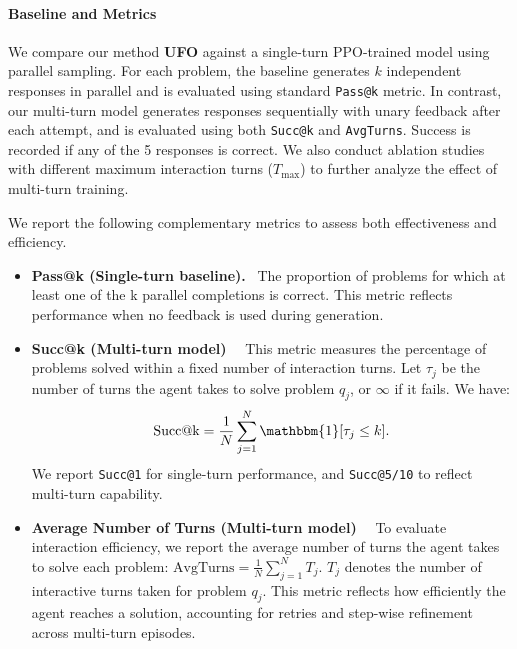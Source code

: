 \paragraph{Baseline and Metrics}
We compare our method\textbf{ UFO} against a single-turn PPO-trained model using parallel sampling. For each problem, the baseline generates $k$ independent responses in parallel and is evaluated using standard \texttt{Pass@k} metric. In contrast, our multi-turn model generates responses sequentially with unary feedback after each attempt, and is evaluated using both \texttt{Succ@k} and \texttt{AvgTurns}. Success is recorded if any of the 5 responses is correct. We also conduct ablation studies with different maximum interaction turns ($T_{\text{max}}$) to further analyze the effect of multi-turn training.

We report the following complementary metrics to assess both effectiveness and efficiency.

\begin{itemize}[topsep=0pt, itemsep=2pt, parsep=0pt, leftmargin=10pt]
    \item \textbf{Pass@k (Single-turn baseline).}~
    The proportion of problems for which at least one of the k parallel completions is correct. This metric reflects performance when no feedback is used during generation.
    \item \textbf{Succ@k (Multi-turn model)}~~
This metric measures the percentage of problems solved within a fixed number of interaction turns. Let $\tau_j$ be the number of turns the agent takes to solve problem $q_j$, or $\infty$ if it fails. We have:
\begin{align}
\text{Succ@k} = \frac{1}{N} \sum_{j=1}^{N} \mathbbm{1}[\tau_j \le k].   
\end{align}
We report \texttt{Succ@1} for single-turn performance, and \texttt{Succ@5/10} to reflect multi-turn capability.
\item \textbf{Average Number of Turns (Multi-turn model)}~~
To evaluate interaction efficiency, we report the average number of turns the agent takes to solve each problem:
$\text{AvgTurns} = \tfrac{1}{N}\sum_{j=1}^{N} T_{j}$. $T_j$ denotes the number of interactive turns taken for problem $q_j$. This metric reflects how efficiently the agent reaches a solution, accounting for retries and step-wise refinement across multi-turn episodes.
\end{itemize}

